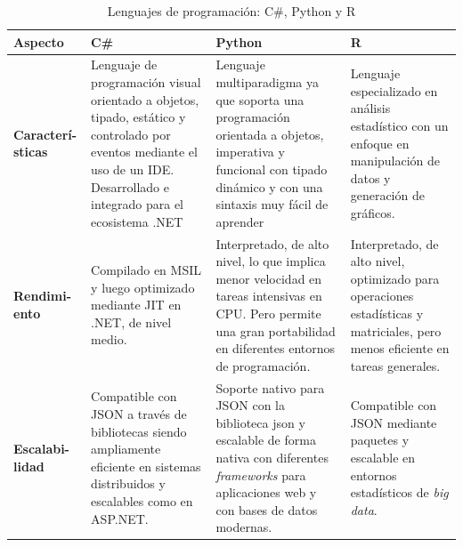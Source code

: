 \begin{landscape}
\begingroup
\setlength{\tabcolsep}{.1pt} %
\renewcommand{\arraystretch}{1.5} %

\begin{table}[h!]
\centering
\caption{Lenguajes de programación: C\#, Python y R}
\label{tab:lenguajesprogramacion}
\footnotesize 
    \small 
    \begin{tabular}{|>{\raggedright\arraybackslash}p{2.5cm}|>{\raggedright\arraybackslash}p{6.7cm}|>{\raggedright\arraybackslash}p{7cm}|>{\raggedright\arraybackslash}p{6.7cm}|}
    \hline
    \textbf{Aspecto} & \textbf{C\#}\cite{MarceloVillalobos2008}\cite{M.Deitel2007} & \textbf{Python}\cite{GonzalezDuque}\cite{Downey2002} & \textbf{R}\cite{Paradis2003} \\
    \hline
    \textbf{Caracterí- sticas} & Lenguaje de programación visual orientado a objetos, tipado, estático y controlado por eventos mediante el uso de un IDE. Desarrollado e integrado para el ecosistema .NET  & Lenguaje multiparadigma ya que soporta una programación orientada a objetos, imperativa y funcional con tipado dinámico y con una sintaxis muy fácil de aprender & Lenguaje especializado en análisis estadístico con un enfoque en manipulación de datos y generación de gráficos. \\
    \hline
    \textbf{Rendimi- ento} & Compilado en MSIL y luego optimizado mediante JIT en .NET, de nivel medio. & Interpretado, de alto nivel, lo que implica menor velocidad en tareas intensivas en CPU. Pero permite una gran portabilidad en diferentes entornos de programación. & Interpretado, de alto nivel, optimizado para operaciones estadísticas y matriciales, pero menos eficiente en tareas generales. \\
    \hline
    \textbf{Escalabi- lidad} & Compatible con JSON a través de bibliotecas siendo ampliamente eficiente en sistemas distribuidos y escalables como en ASP.NET. & Soporte nativo para JSON con la biblioteca json y escalable de forma nativa con diferentes \textit{frameworks} para aplicaciones web y con bases de datos modernas. & Compatible con JSON mediante paquetes y escalable en entornos estadísticos de \textit{big data}.\\

\end{tabular}
\end{table}
\end{landscape}
